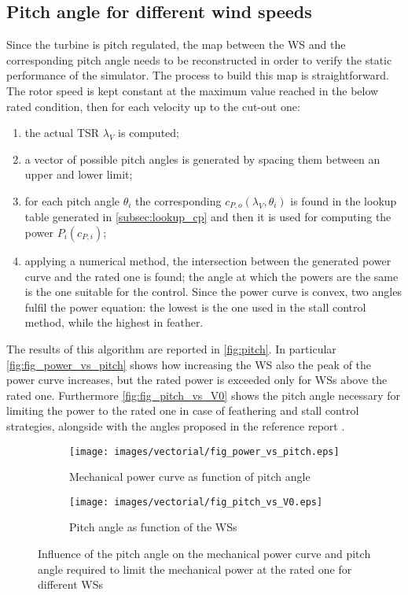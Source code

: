 \subsection{Pitch angle for different wind speeds}\label{subsec:pitch_map}
Since the turbine is pitch regulated, the map between the \acrshort{WS} and the corresponding pitch angle needs to be reconstructed in order to verify the static performance of the simulator. The process to build this map is straightforward. The rotor speed is kept constant at the maximum value reached in the below rated condition, then for each velocity up to the cut-out one:
\begin{enumerate}
    \item  the actual \acrshort{TSR} $\lambda_V$ is computed;
    \item a vector of possible pitch angles is generated by spacing them between an upper and lower limit;
    \item for each pitch angle $\theta_i$ the corresponding $c_{P,o}(\lambda_V, \theta_i)$ is found in the lookup table generated in \autoref{subsec:lookup_cp} and then it is used for computing the power $P_i(c_{P,i})$;
    \item applying a numerical method, the intersection between the generated power curve and the rated one is found; the angle at which the powers are the same is the one suitable for the control. Since the power curve is convex, two angles fulfil the power equation: the lowest is the one used in the stall control method, while the highest in feather.
\end{enumerate}
The results of this algorithm are reported in \autoref{fig:pitch}. In particular \autoref{fig:fig_power_vs_pitch} shows how increasing the \acrshort{WS} also the peak of the power curve increases, but the rated power is exceeded only for \acrshort{WSs} above the rated one. Furthermore \autoref{fig:fig_pitch_vs_V0} shows the pitch angle necessary for limiting the power to the rated one in case of feathering and stall control strategies, alongside with the angles proposed in the reference report \cite{DTU_Wind_Energy_Report-I-0092}. 
\begin{figure}[htb]
    \centering
    \begin{subfigure}{0.49\textwidth}
    \centering
    \texttt{[image: images/vectorial/fig\_power\_vs\_pitch.eps]}
    \caption{Mechanical power curve as function of pitch angle}
    \label{fig:fig_power_vs_pitch}
    \end{subfigure}
    \begin{subfigure}{0.49\textwidth}
    \texttt{[image: images/vectorial/fig\_pitch\_vs\_V0.eps]}
    \caption{Pitch angle as function of the \acrshort{WSs}}
    \label{fig:fig_pitch_vs_V0}
    \end{subfigure}
    \caption{Influence of the pitch angle on the mechanical power curve and pitch angle required to limit the mechanical power at the rated one for different \acrshort{WSs}}
    \label{fig:pitch}
\end{figure}

